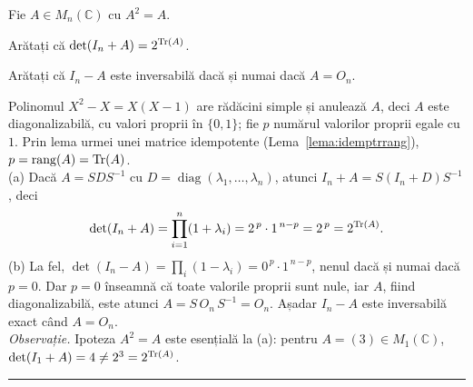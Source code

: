 Fie $A\in M_n(\mathbb{C})$ cu $A^2=A$.
\begin{parti}
  \item Arătați că $\det(I_n+A)=2^{\operatorname{Tr}(A)}$.
  \item Arătați că $I_n-A$ este inversabilă dacă și numai dacă $A=O_n$.
\end{parti}
\sol Polinomul $X^2-X=X(X-1)$ are rădăcini simple și anulează $A$, deci $A$ este diagonalizabilă, cu valori proprii în $\{0,1\}$; fie $p$ numărul valorilor proprii egale cu $1$. Prin lema urmei unei matrice idempotente (Lema~\ref{lema:idemptrrang}), $p=\operatorname{rang}(A)=\operatorname{Tr}(A)$.\\[2pt]
(a) Dacă $A=SDS^{-1}$ cu $D=\operatorname{diag}(\lambda_1,\dots,\lambda_n)$, atunci $I_n+A=S(I_n+D)S^{-1}$, deci
\[ \det(I_n+A)=\prod_{i=1}^n(1+\lambda_i)=2^{\,p}\cdot1^{\,n-p}=2^{\,p}=2^{\operatorname{Tr}(A)}. \]
(b) La fel, $\det(I_n-A)=\prod_i(1-\lambda_i)=0^{\,p}\cdot1^{\,n-p}$, nenul dacă și numai dacă $p=0$. Dar $p=0$ înseamnă că toate valorile proprii sunt nule, iar $A$, fiind diagonalizabilă, este atunci $A=S\,O_n\,S^{-1}=O_n$. Așadar $I_n-A$ este inversabilă exact când $A=O_n$.\\[2pt]
\emph{Observație.} Ipoteza $A^2=A$ este esențială la (a): pentru $A=(3)\in M_1(\mathbb{C})$, $\det(I_1+A)=4\neq2^{3}=2^{\operatorname{Tr}(A)}$.
\vspace{1mm}\hrule

